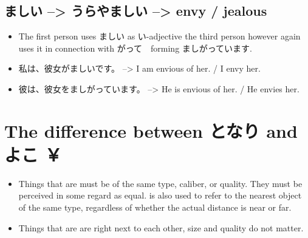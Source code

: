 \documentclass{article}
\newcommand\tabi[1][0.05cm]{\hspace*{#1}}
\begin{document}
\subsection{ましい --> うらやましい --> envy / jealous }
\begin{itemize}
\item The first person uses ましい as い-adjective the third person however again uses it in connection with がって　forming ましがっています.
\item 私は、彼女がましいです。 --> I am envious of her. / I envy her.
\item 彼は、彼女をましがっています。 --> He is envious of her. / He envies her.
\end{itemize}
\section{The difference between となり and よこ ￥} 
\begin{itemize}
\item Things that are  \tabi must be of the same type, caliber, or quality. They must be perceived in some regard as equal.  \tabi is also used to refer to the nearest object of the same type, regardless of whether the actual distance is near or far.
\item Things that are  \tabi are right next to each other, size and quality do not matter.
\end{itemize}
\end{document}
